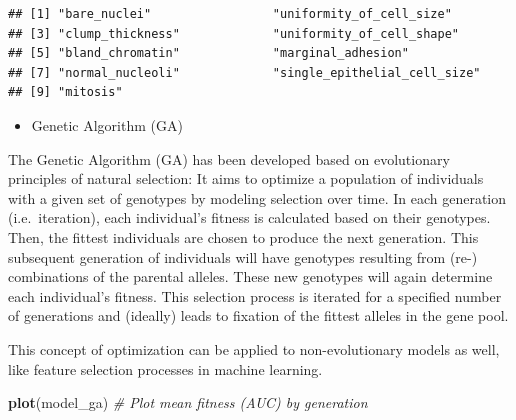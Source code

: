 \documentclass[]{article}
\newenvironment{Shaded}{\begin{snugshade}}{\end{snugshade}}
\newcommand{\KeywordTok}[1]{\textcolor[rgb]{0.13,0.29,0.53}{\textbf{{#1}}}}
\newcommand{\DecValTok}[1]{\textcolor[rgb]{0.00,0.00,0.81}{{#1}}}
\newcommand{\StringTok}[1]{\textcolor[rgb]{0.31,0.60,0.02}{{#1}}}
\newcommand{\CommentTok}[1]{\textcolor[rgb]{0.56,0.35,0.01}{\textit{{#1}}}}
\newcommand{\NormalTok}[1]{{#1}}
\providecommand{\tightlist}{%
  \setlength{\itemsep}{0pt}\setlength{\parskip}{0pt}}
\begin{document}
\begin{verbatim}
## [1] "bare_nuclei"                 "uniformity_of_cell_size"    
## [3] "clump_thickness"             "uniformity_of_cell_shape"   
## [5] "bland_chromatin"             "marginal_adhesion"          
## [7] "normal_nucleoli"             "single_epithelial_cell_size"
## [9] "mitosis"
\end{verbatim}

\begin{Shaded}
\end{Shaded}

\begin{itemize}
\tightlist
\item
  Genetic Algorithm (GA)
\end{itemize}

The Genetic Algorithm (GA) has been developed based on evolutionary
principles of natural selection: It aims to optimize a population of
individuals with a given set of genotypes by modeling selection over
time. In each generation (i.e.~iteration), each individual's fitness is
calculated based on their genotypes. Then, the fittest individuals are
chosen to produce the next generation. This subsequent generation of
individuals will have genotypes resulting from (re-) combinations of the
parental alleles. These new genotypes will again determine each
individual's fitness. This selection process is iterated for a specified
number of generations and (ideally) leads to fixation of the fittest
alleles in the gene pool.

This concept of optimization can be applied to non-evolutionary models
as well, like feature selection processes in machine learning.

\begin{Shaded}
\begin{Highlighting}[]
\KeywordTok{plot}\NormalTok{(model_ga) }\CommentTok{# Plot mean fitness (AUC) by generation}
\end{Highlighting}
\end{Shaded}
\end{document}
